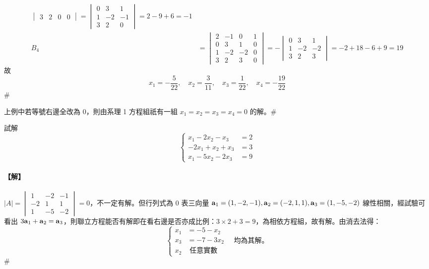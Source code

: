 \begin{align*}
\begin{vmatrix}
3 & 2 & 0 & 0
\end{vmatrix} = \begin{vmatrix}
0 & 3 & 1 \\
1 & -2 & -1 \\
3 & 2 & 0
\end{vmatrix} = 2-9+6 = -1 \\
B_4 &= \begin{vmatrix}
2 & -1 & 0 & 1 \\
0 & 3 & 1 & 0 \\
1 & -2 & -2 & 0 \\
3 & 2 & 3 & 0
\end{vmatrix} = - \begin{vmatrix}
0 & 3 & 1 \\
1 & -2 & -2 \\
3 & 2 & 3
\end{vmatrix} = -2+18-6+9 = 19
\end{align*}
故
\[ x_1 = -\dfrac{5}{22}, \quad x_2 = \dfrac{3}{11}, \quad x_3 = \dfrac{1}{22}, \quad x_4 = -\dfrac{19}{22} \]\hfill$\#$

\begin{example}\label{ex:b6s-1-42}
上例中若等號右邊全改為 0，則由系理 1 方程組祇有一組 $x_1=x_2=x_3=x_4=0$ 的解。\hfill$\#$
\end{example}

\begin{example}\label{ex:b6s-1-43}
試解
\[ \left\{\begin{aligned}
x_1 - 2x_2 - x_3 &= 2 \\
-2x_1 + x_2 + x_3 &= 3 \\
x_1 - 5x_2 - 2x_3 &= 9
\end{aligned}\right. \]
\end{example}

\paragraph{【解】}
$|A| = \begin{vmatrix} 1 & -2 & -1 \\ -2 & 1 & 1 \\ 1 & -5 & -2 \end{vmatrix} = 0$，不一定有解。但行列式為 0 表三向量 $\boldsymbol{\mathbf{a}}_1=(1, -2, -1), \boldsymbol{\mathbf{a}}_2=(-2, 1, 1), \boldsymbol{\mathbf{a}}_3=(1, -5, -2)$ 線性相關，經試驗可看出 $3\boldsymbol{\mathbf{a}}_1 + \boldsymbol{\mathbf{a}}_2 = \boldsymbol{\mathbf{a}}_3$，則聯立方程能否有解即在看右邊是否亦成比例：$3 \times 2 + 3 = 9$，為相依方程組，故有解。由消去法得：
\[ \left\{\begin{aligned}
x_1 &= -5 - x_2 \\
x_3 &= -7 - 3x_2 \\
x_2 &\text{ 任意實數}
\end{aligned}\right. \quad \text{均為其解。} \]\hfill$\#$


